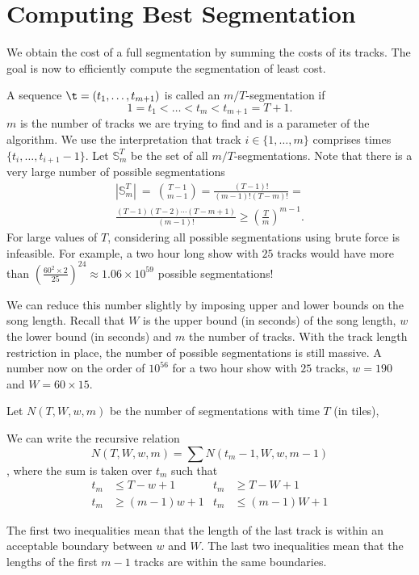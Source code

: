 \documentclass[twocolumn]{article}
\newcommand{\segs}{\mathbb S}
\begin{document}
	\section{Computing Best Segmentation}\label{best_cost}
	
	We obtain the cost of a full segmentation by summing the costs of its tracks. The goal is now to efficiently compute the segmentation of least cost.
	
	
	A sequence $\t = (t_1, \ldots, t_{m+1})$ is called an $m/T$-segmentation if
	\[
	1 = t_1 < \ldots < t_m < t_{m+1} = T+1.
	\]
	$m$ is the number of tracks we are trying to find and is a parameter of the algorithm. We use the interpretation that track $i \in \{1, \ldots, m\}$ comprises times $\{t_i, \ldots, t_{i+1}-1\}$. Let $\segs^T_m$ be the set of all $m/T$-segmentations. Note that there is a very large number of possible segmentations 
	\begin{multline*}
		|\segs^T_m| ~=~ \binom{T-1}{m-1}
		= \frac{(T-1)!}{(m-1)!(T-m)!} =\\
		\frac{(T-1)(T-2)\cdots(T-m+1)}{(m-1)!} \ge \left( \frac{T}{m}\right)^{m-1}.
	\end{multline*} 
	For large values of $T$, considering all possible segmentations using brute force is infeasible. For example, a two hour long show with $25$ tracks would have more than $\left( \frac{60^2 \times 2}{25}\right)^{24}  \approx 1.06 \times 10^{59}$ possible segmentations! 
	
	We can reduce this number slightly by imposing upper and lower bounds on the song length.  Recall that $W$ is the upper bound (in seconds) of the song length, $w$ the lower bound (in seconds) and $m$ the number of tracks. With the track length restriction in place, the number of possible segmentations is still massive. A number now on the order of $10^{56}$ for a two hour show with $25$ tracks, $w=190$ and $W=60\times15$.
	
	
	
	Let $N(T,W,w,m)$ be the number of segmentations with time $T$ (in tiles),
	
	We can write the recursive relation $$N(T,W,w,m) = \sum N(t_m-1,W,w,m-1)$$, where the sum is taken over $t_m$ such that 
	\begin{align*}
		t_m &\le T-w+1 & t_m &\ge T-W+1\\
		t_m &\ge (m-1)w+1 & t_m &\le (m-1)W+1
	\end{align*}
	
	The first two inequalities mean that the length of the last track is within an acceptable boundary between $w$ and $W$. The last two inequalities mean that the lengths of the first $m-1$ tracks are within the same boundaries. 
	
\end{document}
